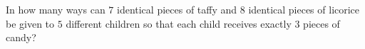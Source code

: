In how many ways can $7$ identical pieces of taffy and $8$ identical pieces of licorice be given to $5$ different children so that each child receives exactly $3$ pieces of candy?
